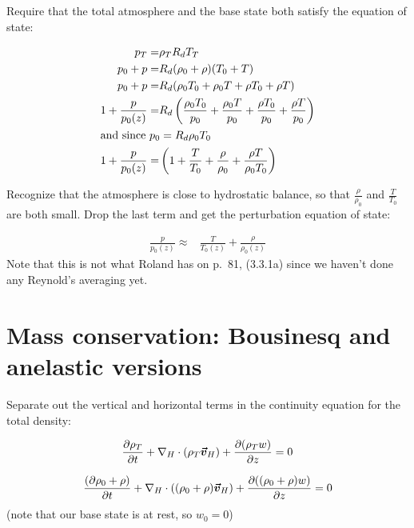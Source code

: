 \documentclass[12pt]{article}
\begin{document}
Require that the total atmosphere and the base state both satisfy the
equation of state:

\begin{subequations}

\begin{align}
  p_T =& \rho_T R_d T_T\\
  p_0 +  p =& R_d(\rho_0 + \rho)(T_0 + T)\\
  p_0 +  p =& R_d(\rho_0 T_0 + \rho_0 T + \rho T_0 + \rho T)\\
  1 + \frac{p}{p_0(z)}  =& R_d \left ( \frac{\rho_0 T_0}{p_0}  + \frac{\rho_0 T}{p_0} + \frac{\rho T_0}{p_0}
           + \frac{\rho T}{p_0} \right )\\
\intertext{and since $p_0 = R_d \rho_0 T_0$}
1 + \frac{p}{p_0(z)}  =& \left ( 1  + \frac{ T}{T_0} + \frac{\rho }{\rho_0} +  \frac{\rho T}{\rho_0 T_0} \right )
\end{align}
\end{subequations}

Recognize that the atmosphere is close to hydrostatic balance, so that $\frac{\rho}{\rho_0}$ and
$\frac{T}{T_0}$ are both small.  Drop the last term and get the perturbation equation of state:


\begin{align}
  \frac{p}{p_0(z)} \approx & \frac{T}{T_0(z)}  + \frac{\rho}{\rho_0(z)} 
\end{align}
Note that this is not what Roland has on p.~81, (3.3.1a) since we haven't done any Reynold's averaging
yet.

\section{Mass conservation: Bousinesq and anelastic versions}
\label{sec:cont}

  Separate  out the vertical and horizontal terms in the continuity equation for the total density:

\begin{equation}
\frac{\partial \rho_T}{\partial t} + \nabla_H \cdot  ( \rho_T \boldsymbol{\vec{v}}_H) + 
          \frac{\partial (\rho_T w)}{\partial z} = 0
\end{equation}

\begin{equation}
  \label{eq:split}
\frac{(\partial \rho_0 + \rho)}{\partial t} + 
       \nabla_H \cdot  (( \rho_0 + \rho) \boldsymbol{\vec{v}}_H) + 
          \frac{\partial ((\rho_0 + \rho) w)}{\partial z} = 0
  \end{equation}
(note that our base state is at rest, so $w_0=0$)
\end{document}
